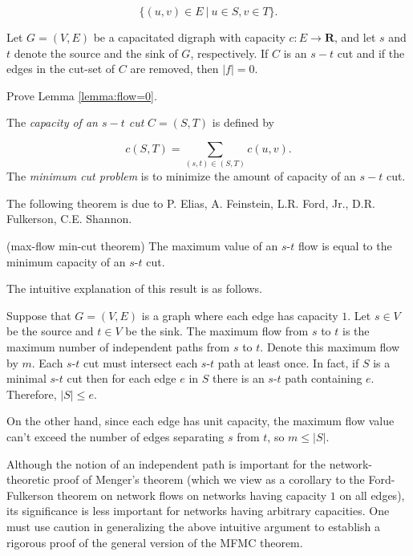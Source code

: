 \[
\{(u,v)\in E\ |\ u\in S, v\in T\}.
\]

\begin{lemma}
\label{lemma:flow=0}
{\rm
Let $G = (V, E)$ be a capacitated digraph with
capacity $c: E \to {\mathbf{R}}$, and let
$s$ and $t$ denote the source and the sink of $G$, respectively.
If $C$ is an $s-t$ cut and if
the edges in the cut-set of $C$ are removed, then $| f | = 0$.
}
\end{lemma}

\begin{exercise}
Prove Lemma \ref{lemma:flow=0}.
\end{exercise}

The {\it capacity of an $s-t$ cut}
$C = (S,T)$ is defined by

\[
c(S,T) = \sum_{(s,t)\in (S,T)} c(u,v).
\]
The {\it minimum cut problem}
is to minimize the amount of capacity of an $s-t$ cut.

The following theorem is due to P. Elias, A. Feinstein, L.R. Ford,
Jr.,  D.R. Fulkerson, C.E. Shannon.

\begin{theorem}
(max-flow min-cut theorem)
{\rm
The maximum value of an $s$-$t$ flow is equal to the minimum capacity of
an $s$-$t$ cut.
}
\end{theorem}

The intuitive explanation of this result is as follows.

Suppose that $G=(V,E)$ is a graph where each edge has capacity $1$.
Let $s\in V$ be the source and $t\in V$ be the sink.
The maximum flow from $s$ to $t$ is the maximum number of
independent paths from $s$ to $t$.
Denote this maximum flow by $m$.
Each $s$-$t$ cut must intersect each $s$-$t$ path at least once.
In fact, if $S$ is a minimal $s$-$t$ cut then for each
edge $e$ in $S$ there is an $s$-$t$ path containing
$e$. Therefore, $|S|\leq e$.

On the other hand, since each edge has unit capacity,
the maximum flow value can't exceed the number of
edges separating $s$ from $t$, so $m\leq |S|$.


\begin{remark}
Although the notion of an independent path is important
for the network-theoretic proof of Menger's theorem
(which we view as a corollary to the Ford-Fulkerson
theorem on network flows on networks having
capacity $1$ on all edges), its significance is less
important for networks having arbitrary capacities.
One must use caution in generalizing the above
intuitive argument to establish a rigorous proof
of the general version of the MFMC theorem.
\end{remark}

